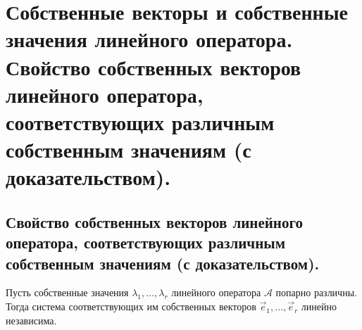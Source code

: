 \section{
    Собственные векторы и собственные значения линейного оператора. Свойство собственных векторов линейного оператора, соответствующих различным собственным значениям (с доказательством).
}

\subsection{
    Свойство собственных векторов линейного оператора, соответствующих различным собственным значениям (с доказательством).
}

\begin{theorem}
    Пусть собственные значения $\lambda_1, \ldots, \lambda_r$ линейного оператора $\mathscr{A}$ попарно различны. Тогда система соответствующих им собственных векторов $\vec{e}_1, \ldots, \vec{e}_r$ линейно независима.
\end{theorem}

